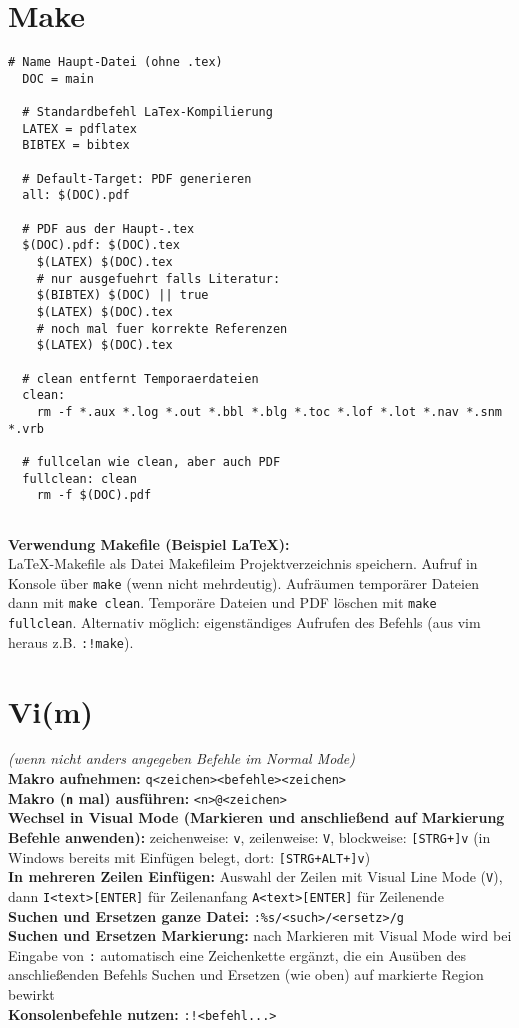 \documentclass[a4paper, twocolumn]{scrarticle}
\begin{document}
\section{Make}
\lstset{language=Makefile}
\begin{lstlisting}[caption={\bfseries Vorlage \LaTeX-Makefile (Tab-Einrückungen wichtig!)}, label=code:make-latex]
  # Name Haupt-Datei (ohne .tex)
  DOC = main
  
  # Standardbefehl LaTex-Kompilierung
  LATEX = pdflatex
  BIBTEX = bibtex
  
  # Default-Target: PDF generieren
  all: $(DOC).pdf
  
  # PDF aus der Haupt-.tex
  $(DOC).pdf: $(DOC).tex
    $(LATEX) $(DOC).tex
    # nur ausgefuehrt falls Literatur:
    $(BIBTEX) $(DOC) || true
    $(LATEX) $(DOC).tex
    # noch mal fuer korrekte Referenzen
    $(LATEX) $(DOC).tex
  
  # clean entfernt Temporaerdateien
  clean:
    rm -f *.aux *.log *.out *.bbl *.blg *.toc *.lof *.lot *.nav *.snm *.vrb
  
  # fullcelan wie clean, aber auch PDF
  fullclean: clean
    rm -f $(DOC).pdf
    
\end{lstlisting}
\textbf{Verwendung Makefile (Beispiel \LaTeX):}\\
\LaTeX-Makefile als Datei \glqq Makefile\grqq im Projektverzeichnis speichern. Aufruf in Konsole über \lstinline|make| (wenn nicht mehrdeutig). Aufräumen temporärer Dateien dann mit \lstinline|make clean|. Temporäre Dateien und PDF löschen mit  \lstinline|make fullclean|. Alternativ möglich: eigenständiges Aufrufen des Befehls (aus vim heraus z.B. \lstinline|:!make|).

\section{Vi(m)}
\lstset{language=Vim}
{\scriptsize \textit{(wenn nicht anders angegeben Befehle im Normal Mode)}}\\
\textbf{Makro aufnehmen:} \lstinline|q<zeichen><befehle><zeichen>|\\
\textbf{Makro (\lstinline|n| mal) ausführen:} \lstinline|<n>@<zeichen>|\\
\textbf{Wechsel in Visual Mode (Markieren und anschließend auf Markierung Befehle anwenden):} zeichenweise: \lstinline|v|, zeilenweise: \lstinline|V|, blockweise: \lstinline|[STRG+]v| (in Windows bereits mit Einfügen belegt, dort: \lstinline|[STRG+ALT+]v|)\\
\textbf{In mehreren Zeilen Einfügen:} Auswahl der Zeilen mit Visual Line Mode (\lstinline|V|), dann \lstinline|I<text>[ENTER]| für Zeilenanfang \lstinline|A<text>[ENTER]| für Zeilenende\\
\textbf{Suchen und Ersetzen ganze Datei:} \lstinline|:%s/<such>/<ersetz>/g|\\
\textbf{Suchen und Ersetzen Markierung:} nach Markieren mit Visual Mode wird bei Eingabe von \lstinline|:| automatisch eine Zeichenkette ergänzt, die ein Ausüben des anschließenden Befehls Suchen und Ersetzen (wie oben) auf markierte Region bewirkt\\
\textbf{Konsolenbefehle nutzen:} \lstinline[language=Vim]|:!<befehl...>|
\end{document}
